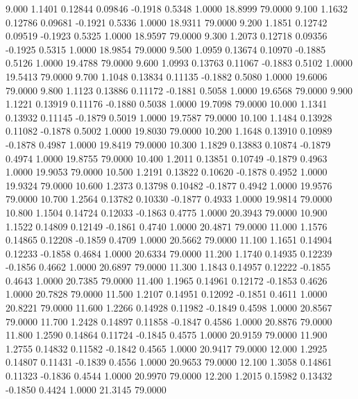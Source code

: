    9.000   1.1401   0.12844   0.09846  -0.1918   0.5348   1.0000  18.8999  79.0000
   9.100   1.1632   0.12786   0.09681  -0.1921   0.5336   1.0000  18.9311  79.0000
   9.200   1.1851   0.12742   0.09519  -0.1923   0.5325   1.0000  18.9597  79.0000
   9.300   1.2073   0.12718   0.09356  -0.1925   0.5315   1.0000  18.9854  79.0000
   9.500   1.0959   0.13674   0.10970  -0.1885   0.5126   1.0000  19.4788  79.0000
   9.600   1.0993   0.13763   0.11067  -0.1883   0.5102   1.0000  19.5413  79.0000
   9.700   1.1048   0.13834   0.11135  -0.1882   0.5080   1.0000  19.6006  79.0000
   9.800   1.1123   0.13886   0.11172  -0.1881   0.5058   1.0000  19.6568  79.0000
   9.900   1.1221   0.13919   0.11176  -0.1880   0.5038   1.0000  19.7098  79.0000
  10.000   1.1341   0.13932   0.11145  -0.1879   0.5019   1.0000  19.7587  79.0000
  10.100   1.1484   0.13928   0.11082  -0.1878   0.5002   1.0000  19.8030  79.0000
  10.200   1.1648   0.13910   0.10989  -0.1878   0.4987   1.0000  19.8419  79.0000
  10.300   1.1829   0.13883   0.10874  -0.1879   0.4974   1.0000  19.8755  79.0000
  10.400   1.2011   0.13851   0.10749  -0.1879   0.4963   1.0000  19.9053  79.0000
  10.500   1.2191   0.13822   0.10620  -0.1878   0.4952   1.0000  19.9324  79.0000
  10.600   1.2373   0.13798   0.10482  -0.1877   0.4942   1.0000  19.9576  79.0000
  10.700   1.2564   0.13782   0.10330  -0.1877   0.4933   1.0000  19.9814  79.0000
  10.800   1.1504   0.14724   0.12033  -0.1863   0.4775   1.0000  20.3943  79.0000
  10.900   1.1522   0.14809   0.12149  -0.1861   0.4740   1.0000  20.4871  79.0000
  11.000   1.1576   0.14865   0.12208  -0.1859   0.4709   1.0000  20.5662  79.0000
  11.100   1.1651   0.14904   0.12233  -0.1858   0.4684   1.0000  20.6334  79.0000
  11.200   1.1740   0.14935   0.12239  -0.1856   0.4662   1.0000  20.6897  79.0000
  11.300   1.1843   0.14957   0.12222  -0.1855   0.4643   1.0000  20.7385  79.0000
  11.400   1.1965   0.14961   0.12172  -0.1853   0.4626   1.0000  20.7828  79.0000
  11.500   1.2107   0.14951   0.12092  -0.1851   0.4611   1.0000  20.8221  79.0000
  11.600   1.2266   0.14928   0.11982  -0.1849   0.4598   1.0000  20.8567  79.0000
  11.700   1.2428   0.14897   0.11858  -0.1847   0.4586   1.0000  20.8876  79.0000
  11.800   1.2590   0.14864   0.11724  -0.1845   0.4575   1.0000  20.9159  79.0000
  11.900   1.2755   0.14832   0.11582  -0.1842   0.4565   1.0000  20.9417  79.0000
  12.000   1.2925   0.14807   0.11431  -0.1839   0.4556   1.0000  20.9653  79.0000
  12.100   1.3058   0.14861   0.11323  -0.1836   0.4544   1.0000  20.9970  79.0000
  12.200   1.2015   0.15982   0.13432  -0.1850   0.4424   1.0000  21.3145  79.0000
